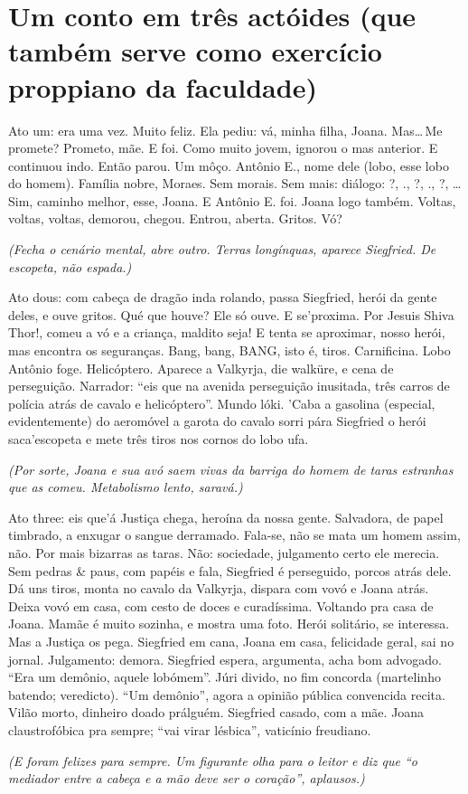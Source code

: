 \chapter{Um conto em três actóides (que também serve como exercício proppiano da faculdade)}

Ato um: era uma vez. Muito feliz. Ela pediu: vá, minha filha, Joana. Mas\ldots\,Me promete? Prometo, mãe. E foi. Como muito jovem, ignorou o mas anterior. E continuou indo. Então parou. Um môço. Antônio E., nome dele (lobo, esse lobo do homem). Família nobre, Moraes. Sem morais. Sem mais: diálogo: ?, ., ?, ., ?, \ldots\,Sim, caminho melhor, esse, Joana. E Antônio E. foi. Joana logo também. Voltas, voltas, voltas, demorou, chegou. Entrou, aberta. Gritos. Vó?

\begin{center}
\emph{(Fecha o cenário mental, abre outro. Terras longínquas, aparece Siegfried. De escopeta, não espada.)}
\end{center}

Ato dous: com cabeça de dragão inda rolando, passa Siegfried, herói da gente deles, e ouve gritos. Qué que houve? Ele só ouve. E se'proxima. Por Jesuis Shiva Thor!, comeu a vó e a criança, maldito seja! E tenta se aproximar, nosso herói, mas encontra os seguranças. Bang, bang, BANG, isto é, tiros. Carnificina. Lobo Antônio foge. Helicóptero. Aparece a Valkyrja, die walküre, e cena de perseguição. Narrador: ``eis que na avenida perseguição inusitada, três carros de polícia atrás de cavalo e helicóptero''. Mundo lóki. 'Caba a gasolina (especial, evidentemente) do aeromóvel a garota do cavalo sorri pára Siegfried o herói saca'escopeta e mete três tiros nos cornos do lobo ufa.

\begin{center}
\emph{(Por sorte, Joana e sua avó saem vivas da barriga do homem de taras estranhas que as comeu. Metabolismo lento, saravá.)}
\end{center}

Ato three: eis que'á Justiça chega, heroína da nossa gente. Salvadora, de papel timbrado, a enxugar o sangue derramado. Fala-se, não se mata um homem assim, não. Por mais bizarras as taras. Não: sociedade, julgamento certo ele merecia. Sem pedras \& paus, com papéis e fala, Siegfried é perseguido, porcos atrás dele. Dá uns tiros, monta no cavalo da Valkyrja, dispara com vovó e Joana atrás. Deixa vovó em casa, com cesto de doces e curadíssima. Voltando pra casa de Joana. Mamãe é muito sozinha, e mostra uma foto. Herói solitário, se interessa. Mas a Justiça os pega. Siegfried em cana, Joana em casa, felicidade geral, sai no jornal. Julgamento: demora. Siegfried espera, argumenta, acha bom advogado. ``Era um demônio, aquele lobómem''. Júri divido, no fim concorda (martelinho batendo; veredicto). ``Um demônio'', agora a opinião pública convencida recita. Vilão morto, dinheiro doado prálguém. Siegfried casado, com a mãe. Joana claustrofóbica pra sempre; ``vai virar lésbica'', vaticínio freudiano.

\begin{center}
\emph{(E foram felizes para sempre. Um figurante olha para o leitor e diz que ``o mediador entre a cabeça e a mão deve ser o coração'', aplausos.)}
\end{center}

